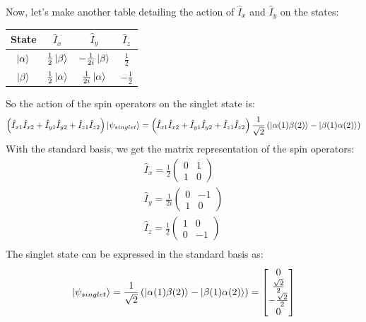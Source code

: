 \documentclass[12pt]{article}
\begin{document}
Now, let's make another table detailing the action of $\hat{I}_{x}$ and $\hat{I}_{y}$ on the states:
\begin{center}
  \begin{tabular}{ |c|c|c|c| } 
    \hline
    State & $\hat{I}_{x}$ & $\hat{I}_{y}$ & $\hat{I}_{z}$\\
    \hline
    $\ket{\alpha}$ & $\frac{1}{2} \ket{\beta}$ & $-\frac{1}{2i} \ket{\beta}$ & $\frac{1}{2}$\\
    $\ket{\beta}$ & $\frac{1}{2} \ket{\alpha}$ & $\frac{1}{2i} \ket{\alpha}$ & $-\frac{1}{2}$\\
    \hline
  \end{tabular}
\end{center}
So the action of the spin operators on the singlet state is:
\begin{align}
  \left(\hat{I}_{x 1} \hat{I}_{x 2} + \hat{I}_{y 1} \hat{I}_{y 2} + \hat{I}_{z 1} \hat{I}_{z 2}\right) \ket{\psi_{singlet}} = \left(\hat{I}_{x 1} \hat{I}_{x 2} + \hat{I}_{y 1} \hat{I}_{y 2} + \hat{I}_{z 1} \hat{I}_{z 2}\right) \frac{1}{\sqrt{2}} \left( \ket{\alpha(1)\beta(2)} - \ket{\beta(1)\alpha(2)} \right)\\
\end{align}
With the standard basis, we get the matrix representation of the spin operators:
\begin{align}
  \hat{I}_{x} = \frac{1}{2} \begin{pmatrix}
    0 & 1\\
    1 & 0
  \end{pmatrix}\\
  \hat{I}_{y} = \frac{1}{2i} \begin{pmatrix}
    0 & -1\\
    1 & 0
  \end{pmatrix}\\
  \hat{I}_{z} = \frac{1}{2} \begin{pmatrix}
    1 & 0\\
    0 & -1
  \end{pmatrix}\\
\end{align}
The singlet state can be expressed in the standard basis as:
\begin{equation}
  \ket{\psi_{singlet}} = \frac{1}{\sqrt{2}} \left( \ket{\alpha(1)\beta(2)} - \ket{\beta(1)\alpha(2)} \right) = \left[\begin{matrix}0\\\frac{\sqrt{2}}{2}\\- \frac{\sqrt{2}}{2}\\0\end{matrix}\right]
\end{equation}
\end{document}
